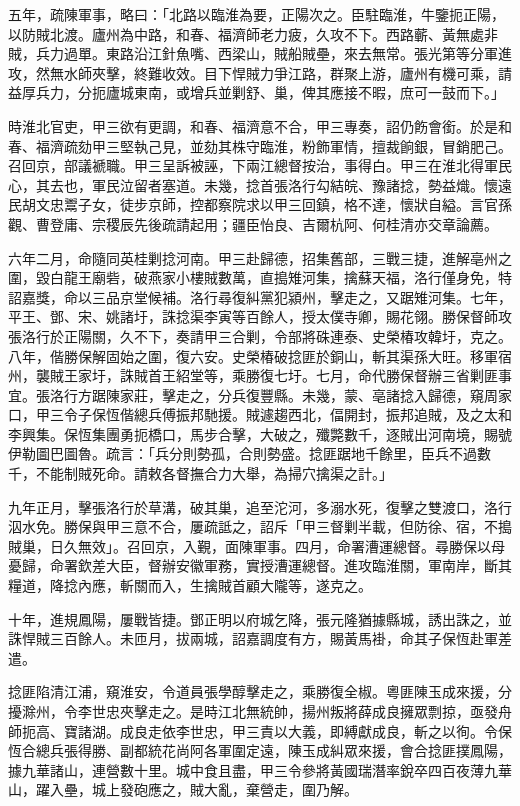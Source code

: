 \begin{pinyinscope}
五年，疏陳軍事，略曰：「北路以臨淮為要，正陽次之。臣駐臨淮，牛鑒扼正陽，以防賊北渡。廬州為中路，和春、福濟師老力疲，久攻不下。西路蘄、黃無處非賊，兵力過單。東路沿江針魚嘴、西梁山，賊船賊壘，來去無常。張光第等分軍進攻，然無水師夾擊，終難收效。目下悍賊力爭江路，群聚上游，廬州有機可乘，請益厚兵力，分扼廬城東南，或增兵並剿舒、巢，俾其應接不暇，庶可一鼓而下。」

時淮北官吏，甲三欲有更調，和春、福濟意不合，甲三專奏，詔仍飭會銜。於是和春、福濟疏劾甲三堅執己見，並劾其株守臨淮，粉飾軍情，擅裁餉銀，冒銷肥己。召回京，部議褫職。甲三呈訴被誣，下兩江總督按治，事得白。甲三在淮北得軍民心，其去也，軍民泣留者塞道。未幾，捻首張洛行勾結皖、豫諸捻，勢益熾。懷遠民胡文忠鬻子女，徒步京師，控都察院求以甲三回鎮，格不達，懷狀自縊。言官孫觀、曹登庸、宗稷辰先後疏請起用；疆臣怡良、吉爾杭阿、何桂清亦交章論薦。

六年二月，命隨同英桂剿捻河南。甲三赴歸德，招集舊部，三戰三捷，進解亳州之圍，毀白龍王廟砦，破燕家小樓賊數萬，直搗雉河集，擒蘇天福，洛行僅身免，特詔嘉獎，命以三品京堂候補。洛行尋復糾黨犯潁州，擊走之，又踞雉河集。七年，平王、鄧、宋、姚諸圩，誅捻渠李寅等百餘人，授太僕寺卿，賜花翎。勝保督師攻張洛行於正陽關，久不下，奏請甲三合剿，令部將硃連泰、史榮椿攻韓圩，克之。八年，偕勝保解固始之圍，復六安。史榮椿破捻匪於銅山，斬其渠孫大旺。移軍宿州，襲賊王家圩，誅賊首王紹堂等，乘勝復七圩。七月，命代勝保督辦三省剿匪事宜。張洛行方踞陳家莊，擊走之，分兵復豐縣。未幾，蒙、亳諸捻入歸德，窺周家口，甲三令子保恆偕總兵傅振邦馳援。賊遽趨西北，偪開封，振邦追賊，及之太和李興集。保恆集團勇扼橋口，馬步合擊，大破之，殲斃數千，逐賊出河南境，賜號伊勒圖巴圖魯。疏言：「兵分則勢孤，合則勢盛。捻匪踞地千餘里，臣兵不過數千，不能制賊死命。請敕各督撫合力大舉，為掃穴擒渠之計。」

九年正月，擊張洛行於草溝，破其巢，追至沱河，多溺水死，復擊之雙渡口，洛行泅水免。勝保與甲三意不合，屢疏詆之，詔斥「甲三督剿半載，但防徐、宿，不搗賊巢，日久無效」。召回京，入覲，面陳軍事。四月，命署漕運總督。尋勝保以母憂歸，命署欽差大臣，督辦安徽軍務，實授漕運總督。進攻臨淮關，軍南岸，斷其糧道，降捻內應，斬關而入，生擒賊首顧大隴等，遂克之。

十年，進規鳳陽，屢戰皆捷。鄧正明以府城乞降，張元隆猶據縣城，誘出誅之，並誅悍賊三百餘人。未匝月，拔兩城，詔嘉調度有方，賜黃馬褂，命其子保恆赴軍差遣。

捻匪陷清江浦，窺淮安，令道員張學醇擊走之，乘勝復全椒。粵匪陳玉成來援，分擾滁州，令李世忠夾擊走之。是時江北無統帥，揚州叛將薛成良擁眾剽掠，亟發舟師扼高、寶諸湖。成良走依李世忠，甲三責以大義，即縛獻成良，斬之以徇。令保恆合總兵張得勝、副都統花尚阿各軍圍定遠，陳玉成糾眾來援，會合捻匪撲鳳陽，據九華諸山，連營數十里。城中食且盡，甲三令參將黃國瑞潛率銳卒四百夜薄九華山，躍入壘，城上發砲應之，賊大亂，棄營走，圍乃解。


\end{pinyinscope}
